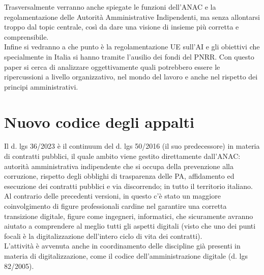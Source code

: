 \documentclass{article}
\begin{document}
\begin{justify}
Trasversalmente verranno anche spiegate le funzioni dell'ANAC e la regolamentazione delle Autorità Amministrative Indipendenti, ma senza allontarsi troppo dal topic centrale, così da dare una visione di insieme più corretta e comprensibile.\\
Infine si vedranno a che punto è la regolamentazione UE sull'AI e gli obiettivi che specialmente in Italia si hanno tramite l'ausilio dei fondi del PNRR.
Con questo paper si cerca di analizzare oggettivamente quali potrebbero essere le ripercussioni a livello organizzativo, nel mondo del lavoro e anche nel rispetto dei principi amministrativi.
\end{justify}

\centering
\section{Nuovo codice degli appalti}
\begin{justify}
    Il d. lgs 36/2023 è il continuum del d. lgs 50/2016 (il suo predecessore) in materia di contratti pubblici, il quale ambito viene gestito direttamente dall'ANAC: autorità amministrativa indipendente che si occupa della prevenzione alla corruzione, rispetto degli obblighi di trasparenza delle PA, affidamento ed esecuzione dei contratti pubblici e via discorrendo; in tutto il territorio italiano.\citep{AnacSite}\\
    Al contrario delle precedenti versioni, in questo c'è stato un maggiore coinvolgimento di figure professionali cardine nel garantire una corretta transizione digitale, figure come ingegneri, informatici, che sicuramente avranno aiutato a comprendere al meglio tutti gli aspetti digitali (visto che uno dei punti focali è la digitalizzazione dell'intero ciclo di vita dei contratti).\\
    L'attività è avvenuta anche in coordinamento delle discipline già presenti in materia di digitalizzazione, come il codice dell'amministrazione digitale (d. lgs 82/2005).
\end{justify}
\end{document}
